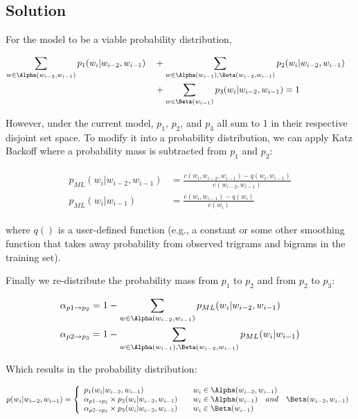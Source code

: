 \documentclass[11pt]{article}
\begin{document}
\subsection*{Solution}

For the model to be a viable probability distribution, 

\begin{align}
	\begin{split}
		\sum_{w \in \Alpha(w_{i-2},w_{i-1})}p_1(w_i|w_{i-2}, w_{i-1}) \quad &+ \sum_{w \in \Alpha(w_{i-1}), \Beta(w_{i-2}, w_{i-1})}p_2(w_i|w_{i-2}, w_{i-1}) \quad  \\
		&+ \sum_{w \in \Beta(w_{i-1})}p_3(w_i|w_{i-2}, w_{i-1})  = 1
	\end{split}
\end{align}

However, under the current model, $p_1$, $p_2$, and $p_3$ all sum to 1 in their respective disjoint set space. To modify it into a probability distribution, we can apply Katz Backoff where a probability mass is subtracted from $p_1$ and $p_2$:

\begin{align}
	\begin{split}
	p_{ML}(w_i|w_{i-2}, w_{i-1}) &= \frac{c( w_i, w_{i-2}, w_{i-1}) - q( w_i, w_{i-1} )}{c(w_{i-2}, w_{i-1})} \\
	p_{ML}(w_i|w_{i-1}) &= \frac{c(w_i, w_{i-1}) - q( w_i )}{c(w_i)}
	\end{split}
\end{align}

where $q()$ is a user-defined function (e.g., a constant or some other smoothing function that takes away probability from observed trigrams and bigrams in the training set). 

Finally we re-distribute the probability mass from $p_1$ to $p_2$ and from $p_2$ to $p_3$:

\begin{align}
	\begin{split}
	\alpha_{p1 \rightarrow p_2}  &= 1 - \sum_{w \in \Alpha(w_{i-2},w_{i-1})}p_{ML}(w_i|w_{i-2}, w_{i-1}) \\
	\alpha_{p2 \rightarrow p_3} &= 1 - \sum_{w \in \Alpha(w_{i-1}), \Beta(w_{i-2}, w_{i-1})}p_{ML}(w_i|w_{i-1}) 
	\end{split}
\end{align}

Which results in the probability distribution:

$$
 	p(w_i|w_{i-2}, w_{i-1}) = \left\{
		\begin{array}{lll}
			p_1(w_i|w_{i-2}, w_{i-1}) \quad &{w_i} \in \Alpha(w_{i-2}, w_{i-1}) \\
			\alpha_{p1 \rightarrow p_2}  \times p_2(w_i|w_{i-2}, w_{i-1}) \quad &{w_i} \in \Alpha(w_{i-1}) \quad and \quad \Beta(w_{i-2}, w_{i-1}) \\
			\alpha_{p2 \rightarrow p_3} \times p_3(w_i|w_{i-2}, w_{i-1}) \quad &{w_i} \in \Beta(w_{i-1})
		\end{array}
		\right.
$$
\end{document}
